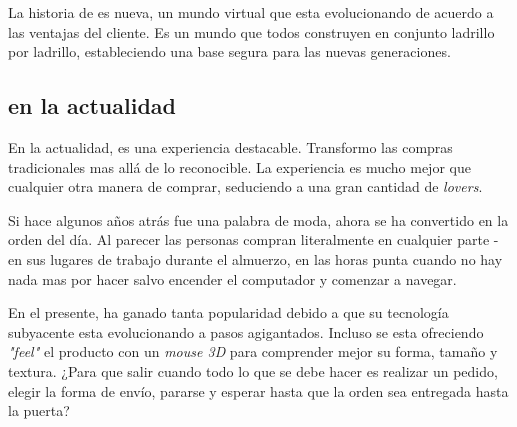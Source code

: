 %
%
%

La historia de \ecommerce es nueva, un mundo virtual que esta evolucionando de acuerdo a las ventajas del cliente. Es un mundo que todos construyen en conjunto ladrillo por ladrillo, estableciendo una base segura para las nuevas generaciones.

\subsection{\ecommerce en la actualidad}

En la actualidad, \ecommerce es una experiencia destacable. Transformo las compras tradicionales mas allá de lo reconocible. La experiencia es mucho mejor que cualquier otra manera de comprar, seduciendo a una gran cantidad de \ecommerce \textit{lovers}.

Si hace algunos años atrás \ecommerce fue una palabra de moda, ahora se ha convertido en la orden del día. Al parecer las personas compran literalmente en cualquier parte - en sus lugares de trabajo durante el almuerzo, en las horas punta cuando no hay nada mas por hacer salvo encender el computador y comenzar a navegar.

En el presente, \ecommerce ha ganado tanta popularidad debido a que su tecnología subyacente esta evolucionando a pasos agigantados. Incluso se esta ofreciendo \textit{"feel"} el producto con un \textit{mouse 3D} para comprender mejor su forma, tamaño y textura. ¿Para que salir cuando todo lo que se debe hacer es realizar un pedido, elegir la forma de envío, pararse y esperar hasta que la orden sea entregada hasta la puerta?

